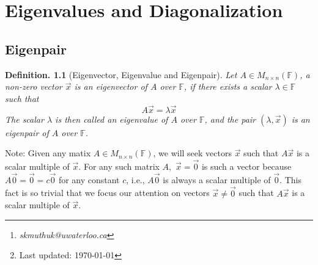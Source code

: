 \documentclass[11pt, a4paper]{memoir}
\title{\subject}
\author{Sachin Kumar\thanks{\itshape skmuthuk@uwaterloo.ca}\\ University of Waterloo}
\date{\semester\thanks{Last updated: \today}}
\theoremstyle{change}
\theoremstyle{plain}
\theoremstyle{nonumberplain}
\newtheorem{definition}{Definition.}
\numberwithin{equation}{section}
\begin{document}
\hypersetup{pageanchor=false}
\maketitle
\newpage
\frontmatter
\hypersetup{pageanchor=true}
\tableofcontents*
\newpage
\mainmatter







\chapter{Eigenvalues and Diagonalization}

\section{Eigenpair}
\begin{definition}[Eigenvector, Eigenvalue and Eigenpair]
    Let $A\in M_{n \times n}(\mathbb{F})$, a non-zero vector $\vec{x}$ is an eigenvector of $A$ over $\mathbb{F}$, if there exists a scalar $\lambda \in \mathbb{F}$ such that 
    $$A\vec{x} = \lambda \vec{x}$$
    The scalar $\lambda$  is then called an eigenvalue of $A$ over $\mathbb{F}$, and the pair $(\lambda, \vec{x})$ is an eigenpair of $A$ over $\mathbb{F}$.
\end{definition}
Note:
Given any matix $A \in M_{n \times n}(\mathbb{F})$, we will seek vectors $\vec{x} $ such that $A\vec{x}$ is a scalar multiple of $\vec{x}$. For any such matrix $A, $ $\vec{x} = \vec{0}$ is such a vector because $A\vec{0} = \vec{0} = c\vec{0}$ for any constant $c$, i.e., $A \vec{0}$ is always a scalar multiple of $\vec{0}$. This fact is so trivial that we focus our attention on vectors $\vec{x} \ne \vec{0}$ such that $A \vec{x} $ is a scalar multiple of $\vec{x}$.
\end{document}
